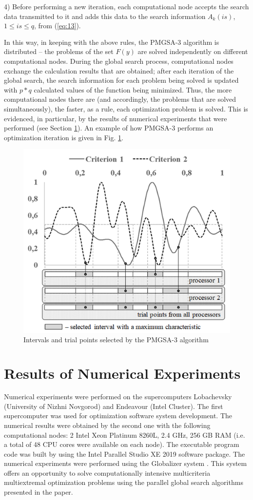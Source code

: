 \documentclass[review]{elsarticle}
\begin{document}
4) Before performing a new iteration, each computational node accepts the search data transmitted to it and adds this data to the search information $A_k (is)$, $1\leq is \leq q$, from (\ref{eq:13}).
	
In this way, in keeping with the above rules, the PMGSA-3 algorithm is distributed -- the problems of the set $F(y)$ are solved independently on different computational nodes. During the global search process, computational nodes exchange the calculation results that are obtained; after each iteration of the global search, the search information for each problem being solved is updated with $p*q$ calculated values of the function being minimized. Thus, the more computational nodes there are (and accordingly, the problems that are solved simultaneously), the faster, as a rule, each optimization problem is solved. This is evidenced, in particular, by the results of numerical experiments that were performed (see Section \ref{sec:5}). An example of how PMGSA-3 performs an optimization iteration is given in Fig. \ref{fig:4}.

\begin{figure}
  \centering
  \includegraphics[width=0.7\linewidth]{fig4}
  \caption{Intervals and trial points selected by the PMGSA-3 algorithm}
  \label{fig:4}
\end{figure}

\section{Results of Numerical Experiments}\label{sec:5}

Numerical experiments were performed on the supercomputers Lobachevsky (University of Nizhni Novgorod) and Endeavour (Intel Cluster). The first supercomputer was used for optimization software system development. The numerical results were obtained by the second one with the following computational nodes: 2 Intel Xeon Platinum 8260L, 2.4 GHz, 256 GB RAM (i.e. a total of 48 CPU cores were available on each node). The executable program code was built by using the Intel Parallel Studio XE 2019 software package. The numerical experiments were performed using the Globalizer system \cite{c36}. This system offers an opportunity to solve computationally intensive multicriteria multiextremal optimization problems using the parallel global search algorithms presented in the paper.
\end{document}
